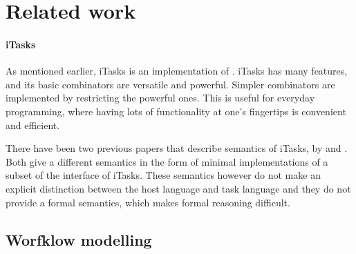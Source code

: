 


\section{Related work}
\label{sec:relatedwork}



\paragraph{iTasks}

As mentioned earlier, iTasks is an implementation of \TOP. iTasks has many
features, and its basic combinators are versatile and powerful. Simpler
combinators are implemented by restricting the powerful ones. This is useful for
everyday programming, where having lots of functionality at one's fingertips is
convenient and efficient.

There have been two previous papers that describe semantics of iTasks, by
\citet{conf/ifl/KoopmanPA08} and \citet{conf/ppdp/PlasmeijerLMAK12}.
Both give a different semantics in the form of minimal implementations of a
subset of the interface of iTasks. These semantics however do not make an
explicit distinction between the host language and task language and they do not
provide a formal semantics, which makes formal reasoning difficult.






\subsection{Worfklow modelling}

